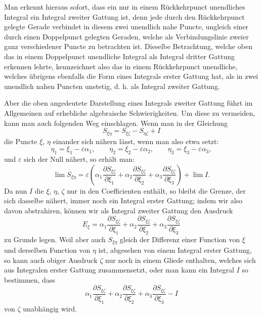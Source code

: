 \documentclass[10pt]{article}
\begin{document}
Man erkennt hieraus sofort, dass ein nur in einem Rückkehrpunct unendliches Integral ein Integral zweiter Gattung ist, denn jede durch den Rückkehrpunct gelegte Gerade verbindet in diesem zwei unendlich nahe Puncte, ungleich einer durch einen Doppelpunct gelegten Geraden, welche als Verbindungslinie zweier ganz verschiedener Puncte zu betrachten ist. Dieselbe Betrachtung, welche oben das in einem Doppelpunct unendliche Integral als Integral dritter Gattung erkennen lehrte, kennzeichnet also das in einem Rückkehrpunct unendliche, welches übrigens ebenfalls die Form eines Integrals erster Gattung hat, als in zwei unendlich nahen Puncten unstetig, d. h. als Integral zweiter Gattung.

Aber die oben angedeutete Darstellung eines Integrals zweiter Gattung führt im Allgemeinen auf erhebliche algebraische Schwierigkeiten. Um diese zu vermeiden, kann man auch folgenden Weg einschlagen. Wenn man in der Gleichung
\[
S_{\xi\eta}=S_{\xi\zeta}-S_{\eta\zeta}+I
\]
die Puncte $\xi$, $\eta$ einander sich nähern lässt, wenn man also etwa setzt:
\[
\eta_1=\xi_1-\varepsilon\alpha_1,
\qquad
\eta_2=\xi_2-\varepsilon\alpha_2,
\qquad
\eta_3=\xi_3-\varepsilon\alpha_3,
\]
und $\varepsilon$ sich der Null nähert, so erhält man:
\[
\lim S_{\xi\eta}=\varepsilon\left(\alpha_1\frac{\partial S_{\xi\zeta}}{\partial \xi_1}+\alpha_2\frac{\partial S_{\xi\zeta}}{\partial \xi_2}+\alpha_3\frac{\partial S_{\xi\zeta}}{\partial \xi_3}\right)+\lim I.
\]
Da nun $I$ die $\xi$, $\eta$, $\zeta$ nur in den Coefficienten enthält, so bleibt die Grenze, der sich dasselbe nähert, immer noch ein Integral erster Gattung; indem wir also davon abstrahiren, können wir als Integral zweiter Gattung den Ausdruck
\[
E_\xi=\alpha_1\frac{\partial S_{\xi\zeta}}{\partial \xi_1}+\alpha_2\frac{\partial S_{\xi\zeta}}{\partial \xi_2}+\alpha_3\frac{\partial S_{\xi\zeta}}{\partial \xi_3}
\]
zu Grunde legen. Weil aber auch $S_{\xi\eta}$ gleich der Differenz einer Function von $\xi$ und derselben Function von $\eta$ ist, abgesehen von einem Integral erster Gattung, so kann auch obiger Ausdruck $\zeta$ nur noch in einem Gliede enthalten, welches sich aus Integralen erster Gattung zusammensetzt, oder man kann ein Integral $I$ so bestimmen, dass
\[
\alpha_1\frac{\partial S_{\xi\zeta}}{\partial \xi_1}+\alpha_2\frac{\partial S_{\xi\zeta}}{\partial \xi_2}+\alpha_3\frac{\partial S_{\xi\zeta}}{\partial \xi_3}-I
\]
von $\zeta$ unabhängig wird.
\end{document}
